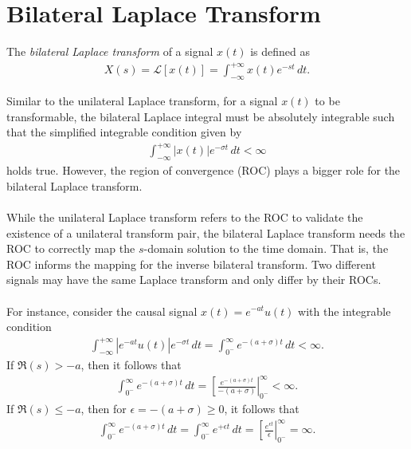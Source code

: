 \documentclass{report}
\begin{document}
\section{Bilateral Laplace Transform}
\begin{tcolorbox}[width=\textwidth,colback={white}, sharp corners]
    The \emph{bilateral Laplace transform} of a signal $x(t)$ is defined as  
    \begin{align}
        X(s) = \mathcal{L}[x(t)] = \int_{-\infty}^{+\infty} x(t) e^{-st} \,dt.
    \end{align}
\end{tcolorbox}
\noindent Similar to the unilateral Laplace transform, for a signal $x(t)$ to be transformable, the bilateral Laplace integral must be absolutely integrable such that 
the simplified integrable condition given by 
\begin{align}
    \int_{-\infty}^{+\infty} |x(t)| e^{-\sigma t} \,dt < \infty
\end{align}
holds true. However, the region of convergence (ROC) plays a bigger role for the bilateral Laplace transform. 
\\ \\ 
While the unilateral Laplace transform refers to the ROC 
to validate the existence of a unilateral transform pair, the bilateral Laplace transform needs the ROC to correctly map the $s$-domain solution to the time domain. 
That is, the ROC informs the mapping for the inverse bilateral transform. Two different signals may have the same Laplace transform and only differ by their ROCs. 
\\ \\
For instance, consider the causal signal $x(t)=e^{-at}u(t)$ with the integrable condition
\begin{align*}
    \int_{-\infty}^{+\infty} |e^{-at}u(t)| e^{-\sigma t} \,dt = \int_{0^-}^{\infty} e^{-(a+\sigma) t} \,dt < \infty.
\end{align*}
If $\Re(s) > -a$, then it follows that 
\begin{align*}
    \int_{0^-}^{\infty} e^{-(a+\sigma) t} \,dt = \left[\frac{e^{-(a+\sigma) t}}{-(a+\sigma)}\right|_{0^-}^{\infty} < \infty.
\end{align*}
If $\Re(s) \leq -a$, then for $\epsilon=-(a+\sigma)\geq 0$, it follows that
\begin{align*}
    \int_{0^-}^{\infty} e^{-(a+\sigma) t} \,dt = \int_{0^-}^{\infty} e^{+\epsilon t} \,dt = \left[\frac{e^{\epsilon t}}{\epsilon}\right|_{0^-}^{\infty} = \infty.
\end{align*}
\end{document}
